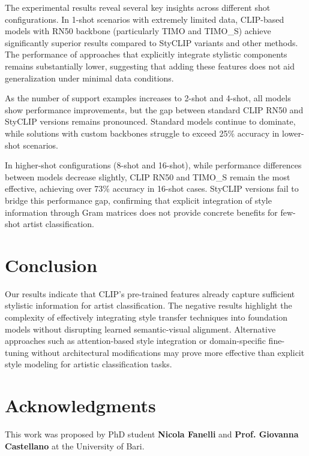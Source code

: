 \documentclass[conference,6pt]{IEEEtran}
\begin{document}
The experimental results reveal several key insights across different shot configurations. In 1-shot scenarios with extremely limited data, CLIP-based models with RN50 backbone (particularly TIMO and TIMO\_S) achieve significantly superior results compared to StyCLIP variants and other methods. The performance of approaches that explicitly integrate stylistic components remains substantially lower, suggesting that adding these features does not aid generalization under minimal data conditions.

As the number of support examples increases to 2-shot and 4-shot, all models show performance improvements, but the gap between standard CLIP RN50 and StyCLIP versions remains pronounced. Standard models continue to dominate, while solutions with custom backbones struggle to exceed 25\% accuracy in lower-shot scenarios.

In higher-shot configurations (8-shot and 16-shot), while performance differences between models decrease slightly, CLIP RN50 and TIMO\_S remain the most effective, achieving over 73\% accuracy in 16-shot cases. StyCLIP versions fail to bridge this performance gap, confirming that explicit integration of style information through Gram matrices does not provide concrete benefits for few-shot artist classification.



\section{Conclusion}

Our results indicate that CLIP's pre-trained features already capture sufficient stylistic information for artist classification. The negative results highlight the complexity of effectively integrating style transfer techniques into foundation models without disrupting learned semantic-visual alignment.
Alternative approaches such as attention-based style integration or domain-specific fine-tuning without architectural modifications may prove more effective than explicit style modeling for artistic classification tasks.

\section{Acknowledgments}
This work was proposed by PhD student \textbf{Nicola Fanelli} and \textbf{Prof. Giovanna Castellano} at the University of Bari. 
\clearpage


\end{document}
